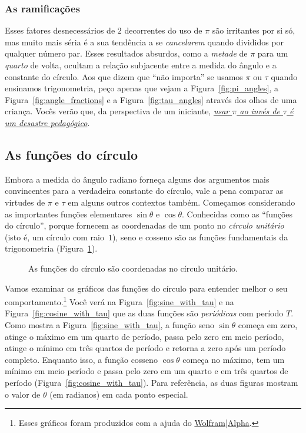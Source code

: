     \subsubsection{As ramificações} %
    \label{sec:the_ramifications}


Esses fatores desnecessários de $2$ decorrentes do uso de $\pi$ são irritantes por si só, mas muito mais séria é a sua tendência a se \emph{cancelarem} quando divididos por qualquer número par. Esses resultados absurdos, como a \emph{metade} de $\pi$ para um \emph{quarto} de volta, ocultam a relação subjacente entre a medida do ângulo e a constante do círculo. Aos que dizem que ``não importa'' se usamos $\pi$ ou $\tau$ quando ensinamos trigonometria, peço apenas que vejam a Figura~\ref{fig:pi_angles}, a Figura~\ref{fig:angle_fractions} e a Figura~\ref{fig:tau_angles} através dos olhos de uma criança. Vocês verão que, da perspectiva de um iniciante, \href{https://tauday.com/a-tau-testimonial}{\emph{usar $\pi$ ao invés de $\tau$ é um desastre pedagógico}}.

  \subsection{As funções do círculo} %
  \label{sec:the_circle_functions}

Embora a medida do ângulo radiano forneça alguns dos argumentos mais convincentes para a verdadeira constante do círculo, vale a pena comparar as virtudes de $\pi$ e $\tau$ em alguns outros contextos também. Começamos considerando as importantes funções elementares $\sin\theta$ e $\cos\theta$. Conhecidas como as ``funções do círculo'', porque fornecem as coordenadas de um ponto no \emph{círculo unitário} (isto é, um círculo com raio~$1$), seno e cosseno são as funções fundamentais da trigonometria (Figura~\ref{fig:circle_functions}).

\begin{figure}
\begin{center}
\end{center}
\caption{As funções do círculo são coordenadas no círculo unitário.\label{fig:circle_functions}}
\end{figure}

Vamos examinar os gráficos das funções do círculo para entender melhor o seu comportamento.\footnote{Esses gráficos foram produzidos com a ajuda do \href{https://www.wolframalpha.com/}{Wolfram|Alpha}.} Você verá na Figura~\ref{fig:sine_with_tau} e na Figura~\ref{fig:cosine_with_tau} que as duas funções são \emph{periódicas} com período $T$. Como mostra a Figura~\ref{fig:sine_with_tau}, a função seno $\sin\theta$ começa em zero, atinge o máximo em um quarto de período, passa pelo zero em meio período, atinge o mínimo em três quartos de período e retorna a zero após um período completo. Enquanto isso, a função cosseno $\cos\theta$ começa no máximo, tem um mínimo em meio período e passa pelo zero em um quarto e em três quartos de período (Figura~\ref{fig:cosine_with_tau}). Para referência, as duas figuras mostram o valor de $\theta$ (em radianos) em cada ponto especial.

